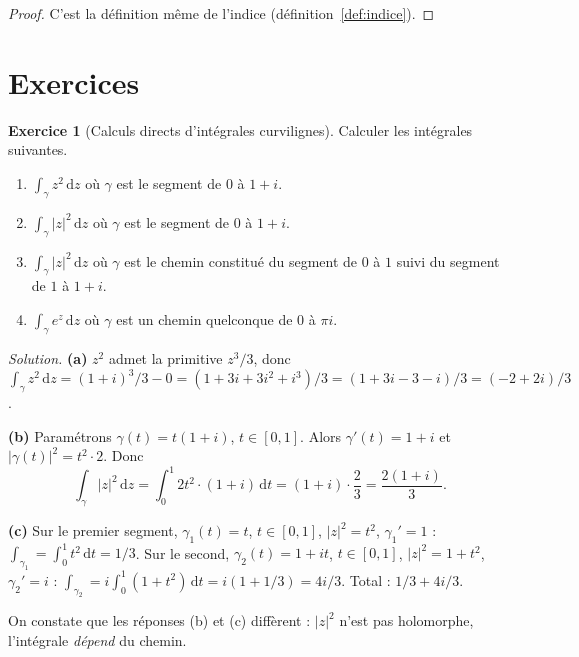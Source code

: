 \documentclass[12pt,a4paper,openany]{book}
\theoremstyle{definition}
\newtheorem{exercice}{Exercice}[chapter]
\theoremstyle{plain}
\theoremstyle{remark}
\newcommand{\dd}{\mathrm{d}}
\newcommand{\abs}[1]{\left|#1\right|}
\begin{document}
\begin{proof}
C'est la définition même de l'indice (définition~\ref{def:indice}).
\end{proof}

\section{Exercices}\label{sec:exercices-ch4}

\begin{exercice}[Calculs directs d'intégrales curvilignes]\label{exo:calculs-directs}
Calculer les intégrales suivantes.
\begin{enumerate}[label=\textup{(\alph*)}]
  \item $\displaystyle\int_\gamma z^2\,\dd z$ où $\gamma$ est le segment de
    $0$ à $1+i$.
  \item $\displaystyle\int_\gamma \abs{z}^2\,\dd z$ où $\gamma$ est le segment
    de $0$ à $1+i$.
  \item $\displaystyle\int_\gamma \abs{z}^2\,\dd z$ où $\gamma$ est le chemin
    constitué du segment de $0$ à $1$ suivi du segment de $1$ à $1+i$.
  \item $\displaystyle\int_\gamma e^z\,\dd z$ où $\gamma$ est un chemin
    quelconque de $0$ à $\pi i$.
\end{enumerate}
\end{exercice}

\noindent\textit{Solution.}\enspace
\textbf{(a)} $z^2$ admet la primitive $z^3/3$, donc
$\int_\gamma z^2\,\dd z = (1+i)^3/3 - 0 = (1+3i+3i^2+i^3)/3 =
(1+3i-3-i)/3 = (-2+2i)/3$.

\textbf{(b)} Paramétrons $\gamma(t) = t(1+i)$, $t \in [0,1]$. Alors
$\gamma'(t) = 1+i$ et $\abs{\gamma(t)}^2 = t^2 \cdot 2$. Donc
\[
  \int_\gamma \abs{z}^2\,\dd z = \int_0^1 2t^2 \cdot (1+i)\,\dd t
  = (1+i) \cdot \frac{2}{3} = \frac{2(1+i)}{3}.
\]

\textbf{(c)} Sur le premier segment, $\gamma_1(t) = t$, $t \in [0,1]$,
$\abs{z}^2 = t^2$, $\gamma_1' = 1$ :
$\int_{\gamma_1} = \int_0^1 t^2\,\dd t = 1/3$. Sur le second,
$\gamma_2(t) = 1+it$, $t \in [0,1]$, $\abs{z}^2 = 1+t^2$, $\gamma_2' = i$ :
$\int_{\gamma_2} = i\int_0^1(1+t^2)\,\dd t = i(1+1/3) = 4i/3$. Total :
$1/3 + 4i/3$.

On constate que les réponses (b) et (c) diffèrent : $\abs{z}^2$ n'est pas
holomorphe, l'intégrale \emph{dépend} du chemin.
\end{document}
